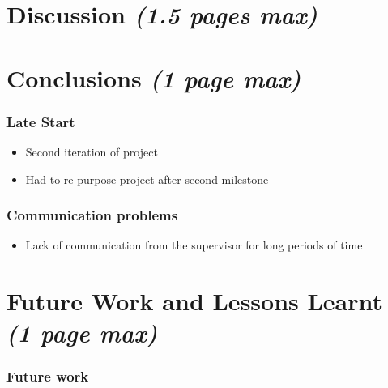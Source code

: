\documentclass[12pt]{article}
\providecommand{\tightlist}{%
  \setlength{\itemsep}{0pt}\setlength{\parskip}{0pt}}
\begin{document}
\hypertarget{discussion-1.5-pages-max}{%
\section{\texorpdfstring{Discussion \emph{(1.5 pages
max)}}{Discussion (1.5 pages max)}}\label{discussion-1.5-pages-max}}

\hypertarget{conclusions-1-page-max}{%
\section{\texorpdfstring{Conclusions \emph{(1 page
max)}}{Conclusions (1 page max)}}\label{conclusions-1-page-max}}

\hypertarget{late-start}{%
\subsubsection{Late Start}\label{late-start}}

\begin{itemize}
\tightlist
\item
  Second iteration of project
\item
  Had to re-purpose project after second milestone
\end{itemize}

\hypertarget{communication-problems}{%
\subsubsection{Communication problems}\label{communication-problems}}

\begin{itemize}
\tightlist
\item
  Lack of communication from the supervisor for long periods of time
\end{itemize}

\hypertarget{future-work-and-lessons-learnt-1-page-max}{%
\section{\texorpdfstring{Future Work and Lessons Learnt \emph{(1 page
max)}}{Future Work and Lessons Learnt (1 page max)}}\label{future-work-and-lessons-learnt-1-page-max}}

\hypertarget{future-work}{%
\subsubsection{Future work}\label{future-work}}
\end{document}

